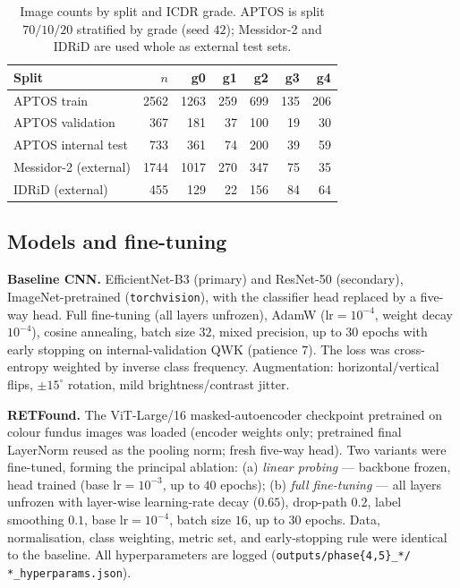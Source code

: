 \documentclass[journal]{IEEEtran}
\begin{document}
\begin{table}[!t]
\centering\small
\caption{Image counts by split and ICDR grade. APTOS is split
$70/10/20$ stratified by grade (seed $42$); Messidor-2 and IDRiD are used whole
as external test sets.}
\label{tab:counts}
\setlength{\tabcolsep}{4pt}
\begin{tabular}{lrrrrrr}
\toprule
Split & $n$ & g0 & g1 & g2 & g3 & g4 \\
\midrule
APTOS train & 2562 & 1263 & 259 & 699 & 135 & 206 \\
APTOS validation & 367 & 181 & 37 & 100 & 19 & 30 \\
APTOS internal test & 733 & 361 & 74 & 200 & 39 & 59 \\
\midrule
Messidor-2 (external) & 1744 & 1017 & 270 & 347 & 75 & 35 \\
IDRiD (external) & 455 & 129 & 22 & 156 & 84 & 64 \\
\bottomrule
\end{tabular}
\end{table}

\subsection{Models and fine-tuning}
\label{sec:methods-models}

\textbf{Baseline CNN.} EfficientNet-B3 \cite{tan2019efficientnet} (primary) and
ResNet-50 \cite{he2016resnet} (secondary), ImageNet-pretrained
(\texttt{torchvision}), with the classifier head replaced by a five-way head.
Full fine-tuning (all layers unfrozen), AdamW ($\text{lr}=10^{-4}$, weight decay
$10^{-4}$), cosine annealing, batch size $32$, mixed precision, up to $30$ epochs
with early stopping on internal-validation QWK (patience $7$). The loss was
cross-entropy weighted by inverse class frequency. Augmentation:
horizontal/vertical flips, $\pm15^{\circ}$ rotation, mild brightness/contrast
jitter.

\textbf{RETFound.} The ViT-Large/16 masked-autoencoder checkpoint pretrained on
colour fundus images \cite{zhou2023retfound} was loaded (encoder weights only;
pretrained final LayerNorm reused as the pooling norm; fresh five-way head). Two
variants were fine-tuned, forming the principal ablation: (a) \emph{linear
probing} --- backbone frozen, head trained (base $\text{lr}=10^{-3}$, up to $40$
epochs); (b) \emph{full fine-tuning} --- all layers unfrozen with layer-wise
learning-rate decay ($0.65$), drop-path $0.2$, label smoothing $0.1$, base
$\text{lr}=10^{-4}$, batch size $16$, up to $30$ epochs. Data, normalisation,
class weighting, metric set, and early-stopping rule were identical to the
baseline. All hyperparameters are logged
(\texttt{outputs/phase\{4,5\}\_*/\,*\_hyperparams.json}).
\end{document}

